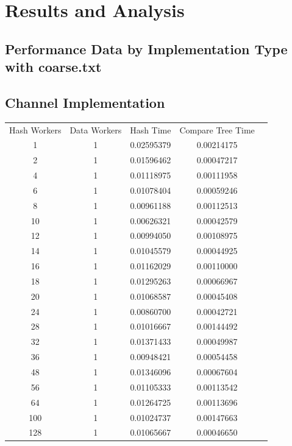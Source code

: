 \documentclass[letterpaper,12pt]{article}
\theoremstyle{remark}
\begin{document}
\section{Results and Analysis}

\subsection{Performance Data by Implementation Type with coarse.txt}

\subsection*{Channel Implementation}
\begin{tabular}{ccccc}

Hash Workers & Data Workers & Hash Time & Compare Tree Time  \\
1 & 1  & 0.02595379 & 0.00214175  \\
2 & 1  & 0.01596462 & 0.00047217  \\
4 & 1  & 0.01118975 & 0.00111958  \\
6 & 1  & 0.01078404 & 0.00059246  \\
8 & 1  & 0.00961188 & 0.00112513  \\
10 & 1  & 0.00626321 & 0.00042579  \\
12 & 1  & 0.00994050 & 0.00108975  \\
14 & 1  & 0.01045579 & 0.00044925  \\
16 & 1  & 0.01162029 & 0.00110000  \\
18 & 1  & 0.01295263 & 0.00066967  \\
20 & 1  & 0.01068587 & 0.00045408  \\
24 & 1  & 0.00860700 & 0.00042721  \\
28 & 1  & 0.01016667 & 0.00144492  \\
32 & 1  & 0.01371433 & 0.00049987  \\
36 & 1  & 0.00948421 & 0.00054458  \\
48 & 1  & 0.01346096 & 0.00067604  \\
56 & 1  & 0.01105333 & 0.00113542  \\
64 & 1  & 0.01264725 & 0.00113696  \\
100 & 1 & 0.01024737 & 0.00147663  \\
128 & 1 & 0.01065667 & 0.00046650  \\


\end{tabular}
\end{document}
